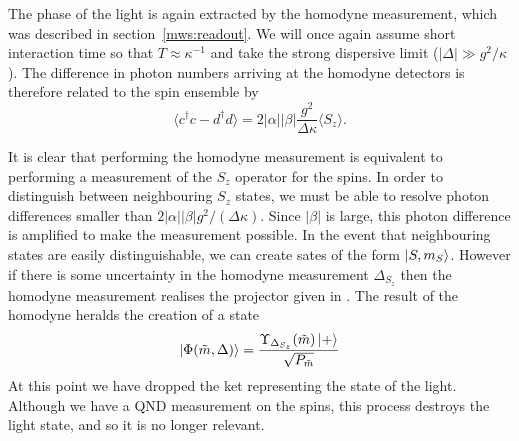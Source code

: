The phase of the light is again extracted by the homodyne measurement, which
was described in section~\ref{mws:readout}. We will once again assume short
interaction time so that $T\approx\kappa^{-1}$ and take the strong dispersive
limit ($|\Delta| \gg g^2/\kappa$). The difference in photon numbers arriving at
the homodyne detectors is therefore related to the spin ensemble by
%
\begin{equation}
  \langle c^\dagger c - d^\dagger d\rangle = 2|\alpha||\beta|
  \frac{g^2}{\Delta\kappa}\langle S_z\rangle.
  \label{eqn:homomeas}
\end{equation}

It is clear that performing the homodyne measurement is equivalent to
performing a measurement of the $S_z$ operator for the spins. In order to
distinguish between neighbouring $S_z$ states, we must be able to resolve
photon differences smaller than $2|\alpha||\beta|g^2/(\Delta\kappa)$. Since
$|\beta|$ is large, this photon difference is amplified to make the measurement
possible. In the event that neighbouring states are easily distinguishable, we
can create sates of the form $\ket{S,m_S}$. However if there is some
uncertainty in the homodyne measurement $\Delta_{S_z}$ then the homodyne
measurement realises the projector given in . 
%
The result of the homodyne heralds the creation of a state
%
\begin{equation}
  \ket{\Phi(\tilde{m}, \Delta)} = \frac{\Upsilon_{\Delta_{S_z}}
  (\tilde{m})\ket{+}}{ \sqrt{P_{\tilde{m}}} }
\end{equation}
%
At this point we have dropped the ket representing the state of the light.
Although we have a QND measurement on the spins, this process destroys the
light state, and so it is no longer relevant.

